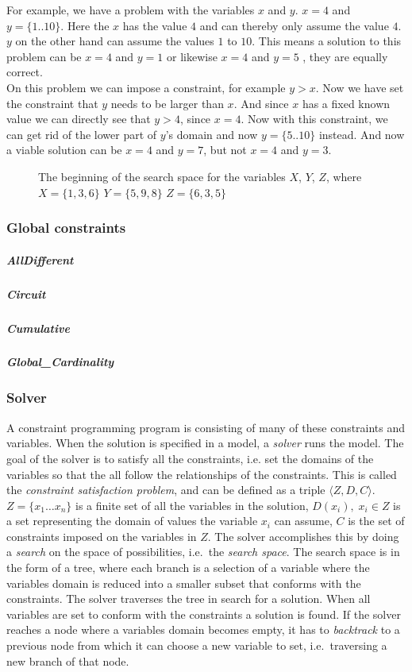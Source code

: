 \begin{framed}
For example, we have a problem with the variables $x$ and $y$. $x = 4$ and $y = \{1..10\}$. Here the $x$ has the value $4$ and can thereby only assume the value $4$. $y$ on the other hand can assume the values $1$ to $10$. This means a solution to this problem can be $x = 4$ and $y = 1$ or likewise $x = 4$ and $y = 5$ , they are equally correct.\\
On this problem we can impose a constraint, for example $y > x$. Now we have set the constraint that $y$ needs to be larger than $x$. And since $x$ has a fixed known value we can directly see that $y > 4$, since $x = 4$. Now with this constraint, we can get rid of the lower part of $y$'s domain and now $y = \{5..10\}$ instead. And now a viable solution can be $x = 4$ and $y = 7$, but not $x = 4$ and $y = 3$.
\end{framed}

\begin{figure}
  \caption{The beginning of the search space for the variables $X$, $Y$, $Z$, where $X=\{1,3,6\}$ $Y=\{5,9,8\}$ $Z=\{6,3,5\}$}
  \label{fig:search_space}
\end{figure}

\subsubsection{Global constraints}
\subparagraph{AllDifferent}
\subparagraph{Circuit}
\subparagraph{Cumulative}
\subparagraph{Global_Cardinality}



\subsubsection{Solver}
A constraint programming program is consisting of many of these constraints and variables. When the solution is specified in a model, a \emph{solver} runs the model. The goal of the solver is to satisfy all the constraints, i.e. set the domains of the variables so that the all follow the relationships of the constraints. This is called the \emph{constraint satisfaction problem}, and can  be defined as a triple $\langle Z,D,C \rangle$. $Z=\{x_1 \ldots x_n\}$ is a finite set of all the variables in the solution, $D(x_i), \; x_i \in Z$ is a set representing the domain of values the variable $x_i$ can assume, $C$ is the set of constraints imposed on the variables in $Z$. The solver accomplishes this by doing a \emph{search} on the space of possibilities, i.e.\ the \emph{search space}. The search space is in the form of a tree, where each branch is a selection of a variable where the variables domain is reduced into a smaller subset that conforms with the constraints. The solver traverses the tree in search for a solution. When all variables are set to conform with the constraints a solution is found. If the solver reaches a node where a variables domain becomes empty, it has to \emph{backtrack} to a previous node from which it can choose a new variable to set, i.e.\ traversing a new branch of that node.

